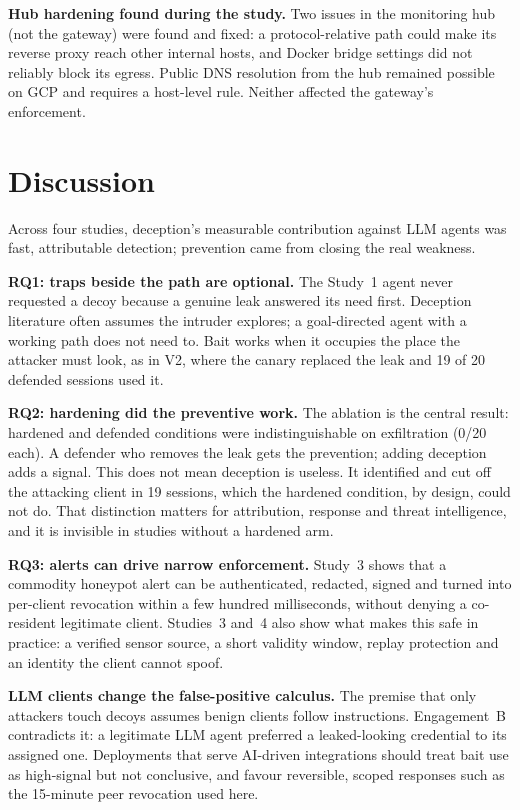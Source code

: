 \documentclass[conference]{IEEEtran}
\begin{document}
\textbf{Hub hardening found during the study.} Two issues in the monitoring hub (not the gateway) were found and fixed: a protocol-relative path could make its reverse proxy reach other internal hosts, and Docker bridge settings did not reliably block its egress. Public DNS resolution from the hub remained possible on GCP and requires a host-level rule. Neither affected the gateway's enforcement.

\section{Discussion}
Across four studies, deception's measurable contribution against LLM agents was fast, attributable detection; prevention came from closing the real weakness.

\textbf{RQ1: traps beside the path are optional.} The Study~1 agent never requested a decoy because a genuine leak answered its need first. Deception literature often assumes the intruder explores; a goal-directed agent with a working path does not need to. Bait works when it occupies the place the attacker must look, as in V2, where the canary replaced the leak and 19 of 20 defended sessions used it.

\textbf{RQ2: hardening did the preventive work.} The ablation is the central result: hardened and defended conditions were indistinguishable on exfiltration (0/20 each). A defender who removes the leak gets the prevention; adding deception adds a signal. This does not mean deception is useless. It identified and cut off the attacking client in 19 sessions, which the hardened condition, by design, could not do. That distinction matters for attribution, response and threat intelligence, and it is invisible in studies without a hardened arm.

\textbf{RQ3: alerts can drive narrow enforcement.} Study~3 shows that a commodity honeypot alert can be authenticated, redacted, signed and turned into per-client revocation within a few hundred milliseconds, without denying a co-resident legitimate client. Studies~3 and~4 also show what makes this safe in practice: a verified sensor source, a short validity window, replay protection and an identity the client cannot spoof.

\textbf{LLM clients change the false-positive calculus.} The premise that only attackers touch decoys assumes benign clients follow instructions. Engagement~B contradicts it: a legitimate LLM agent preferred a leaked-looking credential to its assigned one. Deployments that serve AI-driven integrations should treat bait use as high-signal but not conclusive, and favour reversible, scoped responses such as the 15-minute peer revocation used here.
\end{document}
